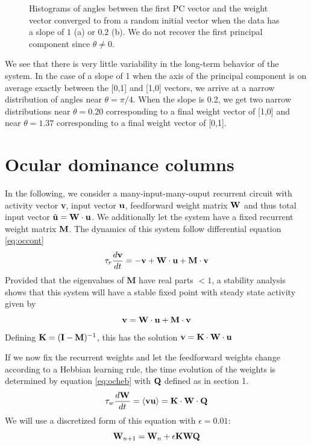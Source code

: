 \documentclass{article}
\begin{document}
\begin{figure}[h]
\begin{subfigure}[t]{0.28\linewidth}
	\end{subfigure}%
\caption{Histograms of angles between the first PC vector and  the weight vector converged to from a random initial vector when the data has a slope of $1$ (a) or $0.2$ (b). We do not recover the first principal component since $\theta \neq 0$.}
\label{fig:thetas}
\end{figure}

We see that there is very little variability in the long-term behavior of the system. In the case of a slope of 1 when the axis of the principal component is on average exactly between the [0,1] and [1,0] vectors, we arrive at a narrow distribution of angles near $\theta = \pi / 4$. When the slope is 0.2, we get two narrow distributions near $\theta = 0.20$ corresponding to a final weight vector of [1,0] and near $\theta = 1.37$ corresponding to a final weight vector of [0,1].

\section{Ocular dominance columns}

In the following, we consider a many-input-many-ouput recurrent circuit with activity vector \textbf{v}, input vector $\bf u$, feedforward weight matrix $\bf W$ and thus total input vector $\tilde {\bf u} = {\bf W \cdot u}$. We additionally let the system have a fixed recurrent weight matrix $\bf M$. The dynamics of this system follow differential equation \ref{eq:occont}
\begin{equation}\label{eq:occont}
\tau_r \dfrac{d \bf v}{dt} = -{\bf v} + {\bf W \cdot u} + {\bf M\cdot v}
\end{equation}
Provided that the eigenvalues of \textbf{M} have real parts $<1$, a stability analysis shows that this system will have a stable fixed point with steady state activity given by 
\begin{equation}
{\bf v} = {\bf W \cdot u} + {\bf M \cdot v}
\end{equation}
Defining ${\bf K} = ({\bf I} - {\bf M})^{-1}$, this has the solution
$
{\bf v} = {\bf K \cdot W \cdot u}
$

If we now fix the recurrent weights and let the feedforward weights change according to a Hebbian learning rule, the time evolution of the weights is determined by equation \ref{eq:ocheb} with $\bf Q$ defined as in section 1.
\begin{equation}\label{eq:ocheb}
\tau_w \dfrac{d{\bf W}}{dt} = \braket{\bf vu} = {\bf K \cdot W \cdot Q}
\end{equation}
We will use a discretized form of this equation with $\epsilon = 0.01$:
\begin{equation}\label{eq:ocdic}
{\bf W}_{n+1} = {\bf W}_n + \epsilon \bf K W Q
\end{equation}
\end{document}
